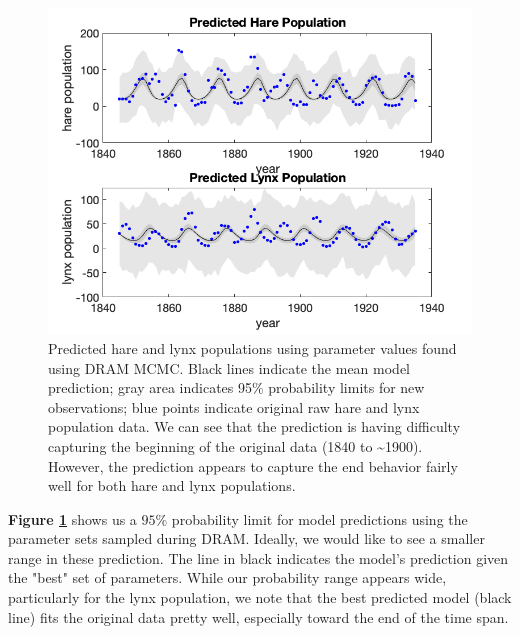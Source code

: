 \documentclass{article}
\begin{document}
\begin{figure}[H]
    \centering
    \includegraphics[width=15cm]{MCMC_figs/final_dram_modpred.png}
    \caption{Predicted hare and lynx populations using parameter values found using DRAM MCMC. Black lines indicate the mean model prediction; gray area indicates 95$\%$ probability limits for new observations; blue points indicate original raw hare and lynx population data. We can see that the prediction is having difficulty capturing the beginning of the original data (1840 to \sim 1900). However, the prediction appears to capture the end behavior fairly well for both hare and lynx populations.}
    \label{fig:10mcmc}
\end{figure}
\textbf{Figure \ref{fig:10mcmc}} shows us a $95\%$ probability limit for model predictions using the parameter sets sampled during DRAM. Ideally, we would like to see a smaller range in these prediction. The line in black indicates the model's prediction given the "best" set of parameters. While our probability range appears wide, particularly for the lynx population, we note that the best predicted model (black line) fits the original data pretty well, especially toward the end of the time span.
\end{document}
